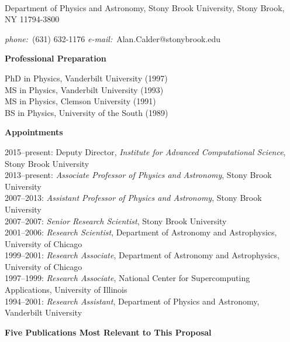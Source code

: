 \documentclass[11pt,letterpaper,english]{article}
\begin{document}
\setlength{\parindent}{0in} %

\setlength{\parindent}{0in} %

\pagestyle{fancy}   \renewcommand{%
\headrulewidth}{0.0pt}

\\
{Department of Physics and Astronomy, Stony Brook University, Stony
  Brook, NY 11794-3800} \smallskip
{{\it phone:}~(631) 632-1176 \hskip 2mm
{\it e-mail:}~Alan.Calder@stonybrook.edu

\begin{flushleft} {\bf Professional Preparation}
{\parindent 16pt

PhD in Physics, Vanderbilt University (1997)\\
MS in Physics, Vanderbilt University (1993)\\
MS in Physics, Clemson University (1991)\\
BS in Physics, University of the South (1989)\\
}


\vspace{.06in}
{\bf Appointments}
{\parindent 16pt

2015--present: Deputy Director, {\em Institute for Advanced Computational Science}, Stony Brook University \\
2013--present: {\em Associate Professor of Physics and Astronomy}, Stony Brook University \\
2007--2013:  {\em Assistant Professor of Physics and Astronomy}, Stony Brook University \\
2007--2007:  {\em Senior Research Scientist}, Stony Brook University \\
2001--2006:  {\em Research Scientist}, Department of Astronomy and Astrophysics, University of Chicago \\
1999--2001:  {\em Research Associate}, Department of Astronomy and Astrophysics, University of Chicago \\
1997--1999:  {\em Research Associate}, National Center for Supercomputing Applications, University of Illinois \\
1994--2001:  {\em Research Assistant}, Department of Physics and Astronomy, Vanderbilt University
}

\vspace{.06in}
{\bf Five Publications Most Relevant to This Proposal}
\vspace{-6pt}


\end{flushleft}}
\end{document}
